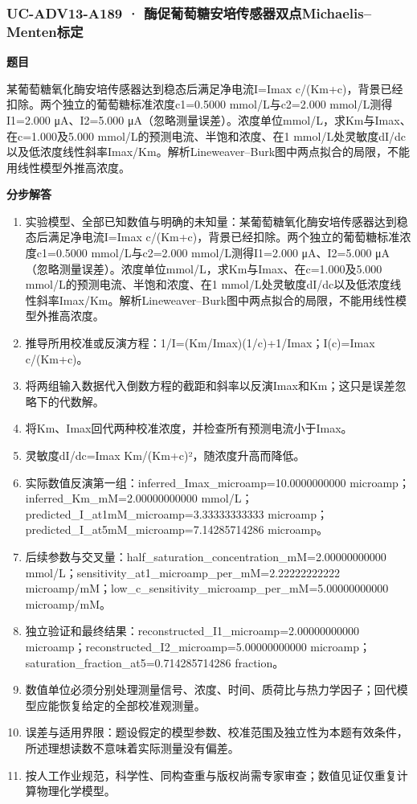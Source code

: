 \documentclass[UTF8,11pt,a4paper]{ctexart}
\begin{document}
\subsubsection*{UC-ADV13-A189 · 酶促葡萄糖安培传感器双点Michaelis–Menten标定}
\noindent\textbf{题目}\par
某葡萄糖氧化酶安培传感器达到稳态后满足净电流I=Imax c/(Km+c)，背景已经扣除。两个独立的葡萄糖标准浓度c1=0.5000 mmol/L与c2=2.000 mmol/L测得I1=2.000 μA、I2=5.000 μA（忽略测量误差）。浓度单位mmol/L，求Km与Imax、在c=1.000及5.000 mmol/L的预测电流、半饱和浓度、在1 mmol/L处灵敏度dI/dc以及低浓度线性斜率Imax/Km。解析Lineweaver–Burk图中两点拟合的局限，不能用线性模型外推高浓度。\par
\medskip\noindent\textbf{分步解答}
\begin{enumerate}
\item 实验模型、全部已知数值与明确的未知量：某葡萄糖氧化酶安培传感器达到稳态后满足净电流I=Imax c/(Km+c)，背景已经扣除。两个独立的葡萄糖标准浓度c1=0.5000 mmol/L与c2=2.000 mmol/L测得I1=2.000 μA、I2=5.000 μA（忽略测量误差）。浓度单位mmol/L，求Km与Imax、在c=1.000及5.000 mmol/L的预测电流、半饱和浓度、在1 mmol/L处灵敏度dI/dc以及低浓度线性斜率Imax/Km。解析Lineweaver–Burk图中两点拟合的局限，不能用线性模型外推高浓度。
\item 推导所用校准或反演方程：1/I=(Km/Imax)(1/c)+1/Imax；I(c)=Imax c/(Km+c)。
\item 将两组输入数据代入倒数方程的截距和斜率以反演Imax和Km；这只是误差忽略下的代数解。
\item 将Km、Imax回代两种校准浓度，并检查所有预测电流小于Imax。
\item 灵敏度dI/dc=Imax Km/(Km+c)²，随浓度升高而降低。
\item 实际数值反演第一组：inferred\_Imax\_microamp=10.0000000000 microamp；inferred\_Km\_mM=2.00000000000 mmol/L；predicted\_I\_at1mM\_microamp=3.33333333333 microamp；predicted\_I\_at5mM\_microamp=7.14285714286 microamp。
\item 后续参数与交叉量：half\_saturation\_concentration\_mM=2.00000000000 mmol/L；sensitivity\_at1\_microamp\_per\_mM=2.22222222222 microamp/mM；low\_c\_sensitivity\_microamp\_per\_mM=5.00000000000 microamp/mM。
\item 独立验证和最终结果：reconstructed\_I1\_microamp=2.00000000000 microamp；reconstructed\_I2\_microamp=5.00000000000 microamp；saturation\_fraction\_at5=0.714285714286 fraction。
\item 数值单位必须分别处理测量信号、浓度、时间、质荷比与热力学因子；回代模型应能恢复给定的全部校准观测量。
\item 误差与适用界限：题设假定的模型参数、校准范围及独立性为本题有效条件，所述理想读数不意味着实际测量没有偏差。
\item 按人工作业规范，科学性、同构查重与版权尚需专家审查；数值见证仅重复计算物理化学模型。
\end{enumerate}
\end{document}

